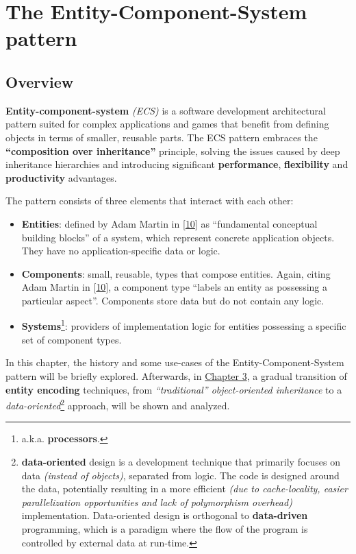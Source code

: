 \documentclass[twoside, 12pt, a4paper, openany]{book}
\begin{document}
\part{The Entity-Component-System pattern}

\hypertarget{ecs_part_overview}{\chapter{Overview}\label{ecs_part_overview}}

\textbf{Entity-component-system} \emph{(ECS)} is a software development
architectural pattern suited for complex applications and games that
benefit from defining objects in terms of smaller, reusable parts. The
ECS pattern embraces the \textbf{``composition over inheritance''}
principle, solving the issues caused by deep inheritance hierarchies and
introducing significant \textbf{performance}, \textbf{flexibility} and
\textbf{productivity} advantages.

The pattern consists of three elements that interact with each other:

\begin{itemize}
\item
  \textbf{Entities}: defined by Adam Martin in
  {[}\protect\hyperlink{ref-tmachine_esmmogfuturep2_2007}{10}{]} as
  ``fundamental conceptual building blocks'' of a system, which
  represent concrete application objects. They have no
  application-specific data or logic.
\item
  \textbf{Components}: small, reusable, types that compose entities.
  Again, citing Adam Martin in
  {[}\protect\hyperlink{ref-tmachine_esmmogfuturep2_2007}{10}{]}, a
  component type ``labels an entity as possessing a particular aspect''.
  Components store data but do not contain any logic.
\item
  \textbf{Systems}\footnote{a.k.a. \textbf{processors}.}: providers of
  implementation logic for entities possessing a specific set of
  component types.
\end{itemize}

In this chapter, the history and some use-cases of the
Entity-Component-System pattern will be briefly explored. Afterwards, in
\protect\hyperlink{chapter_encoding_entities}{Chapter 3}, a gradual
transition of \textbf{entity encoding} techniques, from
\emph{``traditional'' object-oriented inheritance} to a
\emph{data-oriented}\footnote{\textbf{data-oriented} design is a
  development technique that primarily focuses on data \emph{(instead of
  objects)}, separated from logic. The code is designed around the data,
  potentially resulting in a more efficient \emph{(due to
  cache-locality, easier parallelization opportunities and lack of
  polymorphism overhead)} implementation. Data-oriented design is
  orthogonal to \textbf{data-driven} programming, which is a paradigm
  where the flow of the program is controlled by external data at
  run-time.} approach, will be shown and analyzed.
\end{document}
